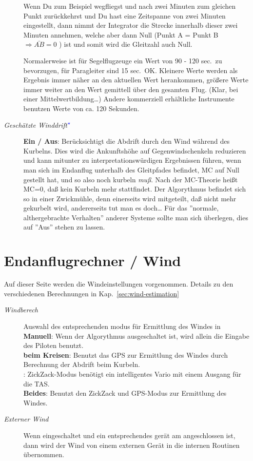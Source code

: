 \begin{description}
Wenn Du zum Beispiel wegfliegst und nach zwei Minuten zum gleichen Punkt zurückkehrst und Du hast eine Zeitspanne von zwei Minuten eingestellt,
dann nimmt der Integrator die Strecke innerhalb dieser zwei Minuten annehmen, welche aber dann Null (Punkt A = Punkt B $\Rightarrow \bar{AB} = 0$ )
ist und somit wird die Gleitzahl auch Null.

Normalerweise ist für Segelflugzeuge ein Wert von 90 - 120 sec.\ zu bevorzugen,
für Paragleiter sind 15 sec.\ OK. Kleinere Werte werden als Ergebnis immer näher an den
aktuellen Wert herankommen, größere Werte immer weiter an den Wert gemittell über den gesamten Flug.
(Klar, bei einer Mittelwertbildung\dots) Andere kommerziell erhältliche Instrumente benutzen Werte von ca. 120 Sekunden.
\item[\textit{Geschätzte Winddrift$^{\textcolor{blue}{\star}}$}]  {\bf Ein / Aus}: Berücksichtigt die Abdrift durch den Wind während des Kurbelns. Dies wird die Ankunftshöhe auf Gegenwindschenkeln reduzieren
und kann mitunter zu interpretationswürdigen Ergebnissen führen,
wenn man sich im Endanflug unterhalb des Gleitpfades befindet, MC auf Null gestellt hat, und so also noch kurbeln \textsl{muß}.
Nach der MC-Theorie heißt MC=0, daß kein Kurbeln mehr stattfindet. Der Algorythmus befindet sich so in einer Zwickmühle, denn einerseits wird mitgeteilt, daß nicht
mehr gekurbelt wird, andererseits tut man es doch\dots
\achtung Für das ''normale, althergebrachte Verhalten'' anderer Systeme sollte man sich überlegen, dies auf ''Aus'' stehen zu lassen.
\end{description}


\section{Endanflugrechner / Wind} \label{sec:final-wind}
Auf dieser Seite werden die Windeinstellungen vorgenommen. Details zu den verschiedenen Berechnungen in Kap.~\ref{sec:wind-estimation}
\begin{description}
\item[\textit{Windberech}]  \label{conf:autowind}  Auswahl des entsprechenden modus für Ermittlung des Windes in \xc \\
  {\bf Manuell}: Wenn der Algorythmus ausgeschaltet ist, wird allein die Eingabe des Piloten benutzt. \\
  {\bf beim Kreisen}: Benutzt das GPS zur Ermittlung des Windes durch Berechnung der Abdrift beim Kurbeln.\\
  : ZickZack-Modus benötigt ein intelligentes Vario  mit einem Ausgang für die TAS.\\
  {\bf Beides}:  Benutzt den ZickZack und GPS-Modus zur Ermittlung des Windes.
\item[\textit{Externer Wind}]  Wenn eingeschaltet und ein entsprechendes gerät am \xc angeschlossen ist, dann wird der Wind von einem
externen Gerät in die internen Routinen übernommen.
\end{description}



